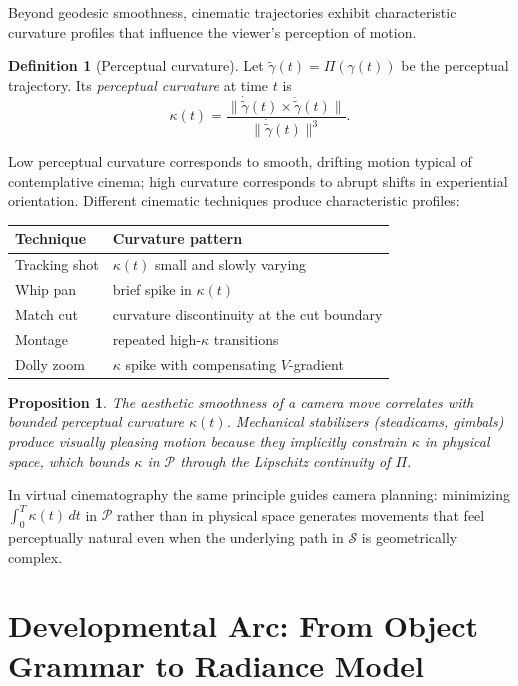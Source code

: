 \documentclass[12pt,a4paper]{article}
\theoremstyle{plain}
\newtheorem{proposition}[theorem]{Proposition}
\theoremstyle{definition}
\newtheorem{definition}[theorem]{Definition}
\begin{document}
Beyond geodesic smoothness, cinematic trajectories exhibit characteristic
curvature profiles that influence the viewer's perception of motion.

\begin{definition}[Perceptual curvature]
Let $\tilde\gamma(t)=\Pi(\gamma(t))$ be the perceptual trajectory. Its
\emph{perceptual curvature} at time $t$ is
\[
\kappa(t)
= \frac{\|\dot{\tilde\gamma}(t)\times\ddot{\tilde\gamma}(t)\|}
       {\|\dot{\tilde\gamma}(t)\|^3}.
\]
\end{definition}

Low perceptual curvature corresponds to smooth, drifting motion typical of
contemplative cinema; high curvature corresponds to abrupt shifts in experiential
orientation. Different cinematic techniques produce characteristic profiles:

\begin{center}
\begin{tabular}{ll}
\toprule
Technique & Curvature pattern \\
\midrule
Tracking shot  & $\kappa(t)$ small and slowly varying \\
Whip pan       & brief spike in $\kappa(t)$ \\
Match cut      & curvature discontinuity at the cut boundary \\
Montage        & repeated high-$\kappa$ transitions \\
Dolly zoom     & $\kappa$ spike with compensating $V$-gradient \\
\bottomrule
\end{tabular}
\end{center}

\begin{proposition}
The aesthetic smoothness of a camera move correlates with bounded perceptual
curvature $\kappa(t)$. Mechanical stabilizers (steadicams, gimbals) produce
visually pleasing motion because they implicitly constrain $\kappa$ in physical
space, which bounds $\kappa$ in $\mathcal{P}$ through the Lipschitz continuity
of $\Pi$.
\end{proposition}

In virtual cinematography the same principle guides camera planning: minimizing
$\int_0^T\kappa(t)\,dt$ in $\mathcal{P}$ rather than in physical space generates
movements that feel perceptually natural even when the underlying path in
$\mathcal{S}$ is geometrically complex.

\section{Developmental Arc: From Object Grammar to Radiance Model}
\label{sec:developmental}
\end{document}
